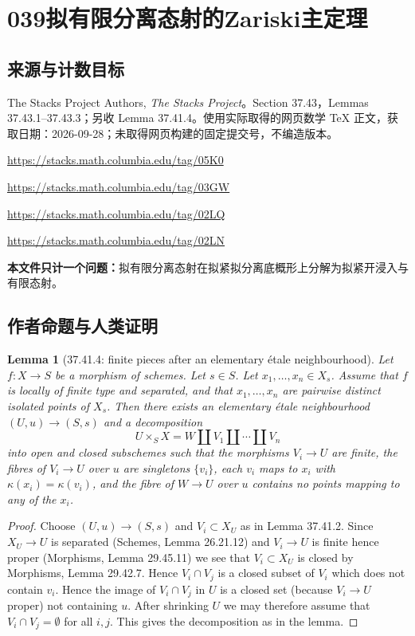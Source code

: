 \documentclass[UTF8,11pt]{ctexart}
\newtheorem*{lemma}{Lemma}
\theoremstyle{definition}
\begin{document}
\section*{039\quad 拟有限分离态射的Zariski主定理}
\subsection*{来源与计数目标}
The Stacks Project Authors, \emph{The Stacks Project}。Section 37.43，Lemmas 37.43.1--37.43.3；另收 Lemma 37.41.4。使用实际取得的网页数学 TeX 正文，获取日期：2026-09-28；未取得网页构建的固定提交号，不编造版本。
\par\url{https://stacks.math.columbia.edu/tag/05K0}
\par\url{https://stacks.math.columbia.edu/tag/03GW}
\par\url{https://stacks.math.columbia.edu/tag/02LQ}
\par\url{https://stacks.math.columbia.edu/tag/02LN}

\par\textbf{本文件只计一个问题：}拟有限分离态射在拟紧拟分离底概形上分解为拟紧开浸入与有限态射。
\subsection*{作者命题与人类证明}

\begin{lemma}[37.41.4: finite pieces after an elementary étale neighbourhood]
Let $f:X\to S$ be a morphism of schemes. Let $s\in S$. Let $x_1,\ldots,x_n\in X_s$. Assume that $f$ is locally of finite type and separated, and that $x_1,\ldots,x_n$ are pairwise distinct isolated points of $X_s$. Then there exists an elementary étale neighbourhood $(U,u)\to(S,s)$ and a decomposition
\[
U\times_S X=W\amalg V_1\amalg\cdots\amalg V_n
\]
into open and closed subschemes such that the morphisms $V_i\to U$ are finite, the fibres of $V_i\to U$ over $u$ are singletons $\{v_i\}$, each $v_i$ maps to $x_i$ with $\kappa(x_i)=\kappa(v_i)$, and the fibre of $W\to U$ over $u$ contains no points mapping to any of the $x_i$.
\end{lemma}
\begin{proof}
Choose $(U,u)\to(S,s)$ and $V_i\subset X_U$ as in Lemma 37.41.2. Since $X_U\to U$ is separated (Schemes, Lemma 26.21.12) and $V_i\to U$ is finite hence proper (Morphisms, Lemma 29.45.11) we see that $V_i\subset X_U$ is closed by Morphisms, Lemma 29.42.7. Hence $V_i\cap V_j$ is a closed subset of $V_i$ which does not contain $v_i$. Hence the image of $V_i\cap V_j$ in $U$ is a closed set (because $V_i\to U$ proper) not containing $u$. After shrinking $U$ we may therefore assume that $V_i\cap V_j=\emptyset$ for all $i,j$. This gives the decomposition as in the lemma.
\end{proof}
\end{document}
